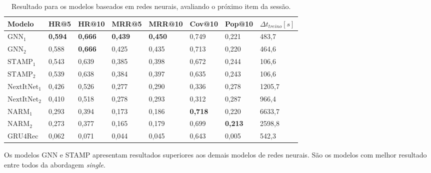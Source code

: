 \begin{table}[htbp]
  \centering
  \begin{tabular}{|l|l|l|l|l|l|l|l|}
  \hline
  Modelo & HR@5 & HR@10 & MRR@5 & MRR@10 & Cov@10 & Pop@10 & $\Delta t_{treino} [s]$ \\
  \hline
  $\text{GNN}_1$ & \textbf{0,594} & \textbf{0,666} & \textbf{0,439} & \textbf{0,450} & 0,749 & 0,221 & 483,7 \\
  \hline
  $\text{GNN}_2$ & 0,588 & \textbf{0,666} & 0,425 & 0,435 & 0,713 & 0,220 & 464,6 \\
  \hline
  $\text{STAMP}_1$ & 0,543 & 0,639 & 0,385 & 0,398 & 0,672 & 0,244 & 106,6 \\
  \hline
  $\text{STAMP}_2$ & 0,539 & 0,638 & 0,384 & 0,397 & 0,635 & 0,243 & 106,6 \\
  \hline  
  $\text{NextItNet}_1$ & 0,426 & 0,526 & 0,277 & 0,290 & 0,336 & 0,278 & 1205,7 \\
  \hline
  $\text{NextItNet}_2$ & 0,410 & 0,518 & 0,278 & 0,293 & 0,312 & 0,287 & 966,4 \\
  \hline
  $\text{NARM}_1$ & 0,293 & 0,394 & 0,173 & 0,186 & \textbf{0,718} & 0,220 & 6633,7 \\
  \hline
  $\text{NARM}_2$ &  0,273 & 0,377 & 0,165 & 0,179 & 0,699 & \textbf{0,213} & 2598,8 \\
  \hline
  $\text{GRU4Rec}$ & 0,062 & 0,071 & 0,044 & 0,045 & 0,643 & 0,005 & 542,3 \\
  \hline
  \end{tabular}
  \caption{Resultado para os modelos baseados em redes neurais, avaliando o próximo item da sessão.}
  \label{tab_nn_next_item}
\end{table}

Os modelos GNN e STAMP apresentam resultados superiores aos demais modelos de
redes neurais. São os modelos com melhor resultado entre todos da abordagem
\textit{single}.




